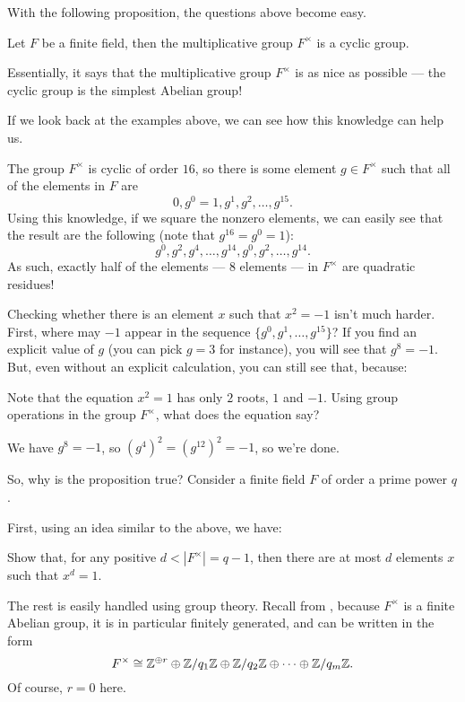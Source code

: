 With the following proposition, the questions above become easy.
\begin{proposition}
	Let $F$ be a finite field, then the multiplicative group $F^\times$ is a cyclic group.
\end{proposition}

Essentially, it says that the multiplicative group $F^\times$ is as nice as possible --- the cyclic
group is the simplest Abelian group!

If we look back at the examples above, we can see how this knowledge can help us.

\begin{example}
The group $F^\times$ is cyclic of order $16$, so there is some element $g \in F^\times$ such
that all of the elements in $F$ are
\[ 0, g^0 = 1, g^1, g^2, \dots, g^15.  \]
Using this knowledge, if we square the nonzero elements, we can easily see that the result are the
following (note that $g^16 = g^0 = 1$):
\[ g^0, g^2, g^4, \dots, g^14, g^0, g^2, \dots, g^14.  \]
As such, exactly half of the elements --- 8 elements --- in $F^\times$ are quadratic residues!

Checking whether there is an element $x$ such that $x^2 = -1$ isn't much harder.
First, where may $-1$ appear in the sequence $\{g^0, g^1, \dots, g^15 \}$?
If you find an explicit value of $g$ (you can pick $g = 3$ for instance), you will see that $g^8 =
-1$. But, even without an explicit calculation, you can still see that, because:
\begin{ques}
	Note that the equation $x^2 = 1$ has only $2$ roots, $1$ and $-1$.
	Using group operations in the group $F^\times$, what does the equation say?
\end{ques}
We have $g^8 = -1$, so $(g^4)^2 = (g^12)^2 = -1$, so we're done.
\end{example}

So, why is the proposition true? Consider a finite field $F$ of order a prime power $q$.

First, using an idea similar to the above, we have:
\begin{ques}
	Show that, for any positive $d < |F^\times| = q-1$, then there are at most $d$ elements $x$ such
	that $x^d = 1$.
\end{ques}
The rest is easily handled using group theory.
Recall from , because $F^\times$ is a finite Abelian group, it is
in particular finitely generated, and can be written in the form
\[ F^\times \cong \mathbb Z^{\oplus r} \oplus \mathbb Z/q_1\mathbb Z \oplus \mathbb Z/q_2\mathbb Z \oplus
	\dots \oplus \mathbb Z/q_m\mathbb Z.  \]
Of course, $r = 0$ here.

